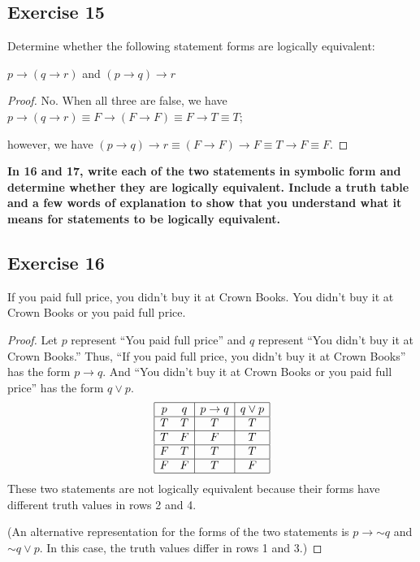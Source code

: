\documentclass[14pt]{extarticle}
\begin{document}
\subsection{Exercise 15} 
Determine whether the following statement forms are logically equivalent:

$p \to (q \to r)$ and $(p \to q) \to r$

\begin{proof} 
No. When all three are false, we have $p \to (q \to r) \equiv F \to (F \to F) \equiv F \to T \equiv T$;

however, we have $(p \to q) \to r \equiv (F \to F) \to F \equiv T \to F \equiv F$. 
\end{proof}

{\bf In 16 and 17, write each of the two statements in symbolic form and determine whether they are logically equivalent. Include a truth table and a few words of explanation to show that you understand what it means for statements to be logically equivalent.}

\subsection{Exercise 16} 
If you paid full price, you didn’t buy it at Crown Books. You didn’t buy it at Crown Books or you paid full price.

\begin{proof} 
Let $p$ represent “You paid full price” and $q$ represent “You
didn’t buy it at Crown Books.” Thus, “If you paid full price, you didn’t buy it at Crown Books” has the form $p \to q$. And “You didn’t buy it at Crown Books or you paid full price” has the form $q \vee p$.
$$ 
\begin{array}{|cc|c|c|} 
\hline 
p & q & p \to q & q \vee p \\ 
\hline 
T & T & T & T \\ 
\hline 
T & F & F & T \\ 
\hline 
F & T & T & T \\ 
\hline 
F & F & T & F \\
\hline 
\end{array} 
$$
These two statements are not logically equivalent because their forms have different truth values in rows 2 and 4.

(An alternative representation for the forms of the two statements is $p \to {\sim q}$ and ${\sim q} \vee p$. In this case, the truth values differ in rows 1 and 3.) 
\end{proof}
\end{document}
